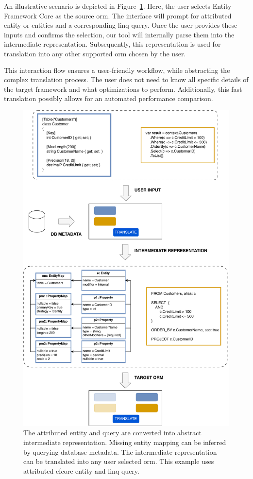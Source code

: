 An illustrative scenario is depicted in Figure~\ref{fig:orm_to_abstract}. Here, the user selects Entity Framework Core as the source \acrshort{orm}. The interface will prompt for attributed entity or entities and a corresponding \acrshort{linq} query. Once the user provides these inputs and confirms the selection, our tool will internally parse them into the intermediate representation. Subsequently, this representation is used for translation into any other supported \acrshort{orm} chosen by the user.

This interaction flow ensures a user-friendly workflow, while abstracting the complex translation process. The user does not need to know all specific details of the target framework and what optimizations to perform. Additionally, this fast translation possibly allows for an automated performance comparison.

\begin{figure}[p]
  \centering
  \includegraphics[width=\textwidth]{thesis/img/thesis/03_user_interaction.drawio.pdf}
  \caption{The attributed entity and query are converted into abstract intermediate representation. Missing entity mapping can be inferred by querying database metadata. The intermediate representation can be translated into any user selected \acrshort{orm}. This example uses attributed \acrshort{efcore} entity and \acrshort{linq} query.}
  \label{fig:orm_to_abstract}
\end{figure}

